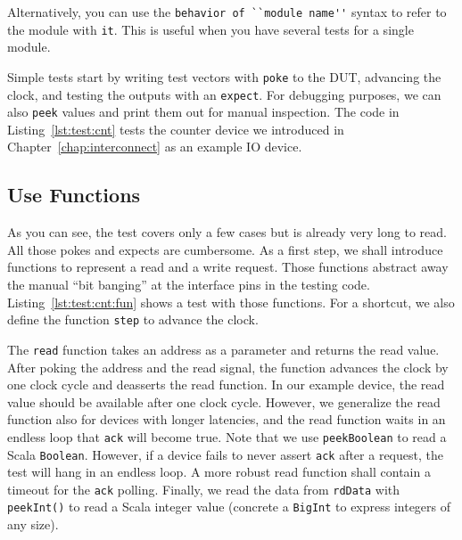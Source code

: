 \documentclass[%
    10pt,
    headinclude, footinclude=false,
    openright, %
    notitlepage,
    cleardoublepage=empty,
    headsepline,
    numbers=noenddot,
    bibliography=totoc, index=totoc,
    ]{scrbook}
\newcommand{\code}[1]{{\lstinline[basicstyle=\small\ttfamily]{#1}}}
\begin{document}

Alternatively, you can use the \code{behavior of ``module name''} syntax to
refer to the module with \code{it}. This is useful when you have several tests for a
single module.


Simple tests start by writing test vectors with \code{poke} to the DUT, advancing the
clock, and testing the outputs with an \code{expect}. For debugging purposes, we can also
\code{peek} values and print them out for manual inspection. The code in Listing~\ref{lst:test:cnt} tests the
counter device we introduced in Chapter~\ref{chap:interconnect} as an example IO device.


\subsection{Use Functions}

As you can see, the test covers only a few cases but is already very long to read.
All those pokes and expects are cumbersome. As a first step, we shall introduce
functions to represent a read and a write request. Those functions abstract away the manual
``bit banging'' at the interface pins in the testing code.
Listing~\ref{lst:test:cnt:fun} shows a test with those functions. For a shortcut, we also define
the function \code{step} to advance the clock.


The \code{read} function takes an address
as a parameter and returns the read value. After poking the address and the read signal, the function
advances the clock by one clock cycle and deasserts the read function. In our example device,
the read value should be available after one clock cycle. However, we generalize the read function
also for devices with longer latencies, and the read function waits in an endless loop that \code{ack}
will become true. Note that we use \code{peekBoolean} to read a Scala \code{Boolean}.
However, if a device fails to never assert \code{ack} after a request,
the test will hang in an endless loop. A more robust read function shall contain a timeout for the \code{ack}
polling. Finally, we read the data from \code{rdData} with \code{peekInt()} to read a Scala integer
value (concrete a \code{BigInt} to express integers of any size).
\end{document}
